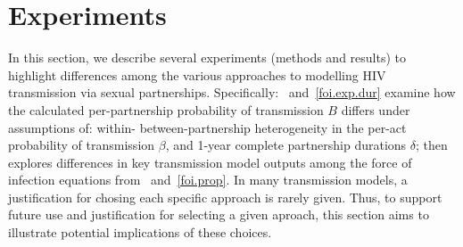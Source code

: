 \section{Experiments}\label{foi.exp}
In this section, we describe several experiments (methods and results) to %
highlight differences among the various approaches %
to modelling HIV transmission via sexual partnerships.
Specifically:
~and~\ref{foi.exp.dur} examine how
the calculated per-partnership probability of transmission $B$ differs under assumptions of:
within- \vs between-partnership heterogeneity in the per-act probability of transmission $\beta$,
and 1-year \vs complete partnership durations $\delta$; then
 explores differences in key transmission model outputs
among the force of infection equations from ~and~\ref{foi.prop}.
In many transmission models,
a justification for chosing each specific approach is rarely given. %
Thus, to support future use and justification for selecting a given aproach, this section aims to illustrate potential implications of these choices.  %
